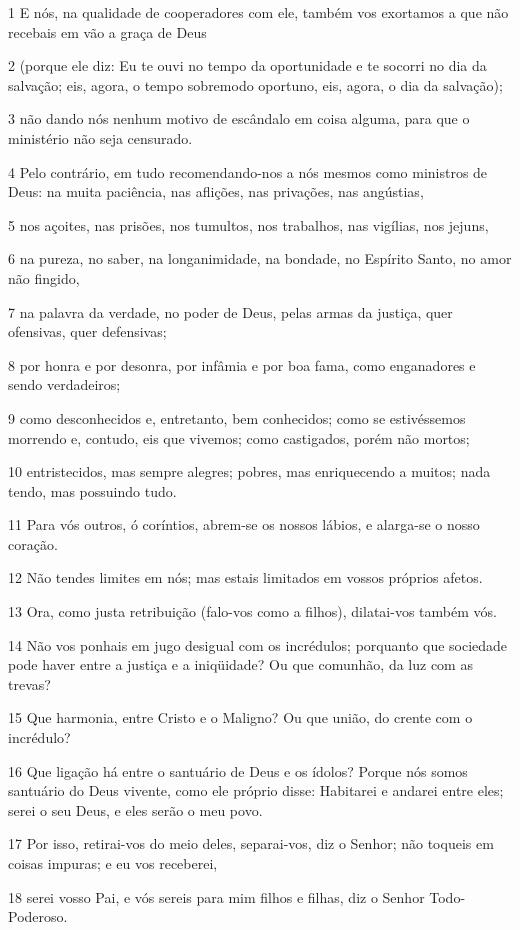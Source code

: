 \par 1 E nós, na qualidade de cooperadores com ele, também vos exortamos a que não recebais em vão a graça de Deus
\par 2 (porque ele diz: Eu te ouvi no tempo da oportunidade e te socorri no dia da salvação; eis, agora, o tempo sobremodo oportuno, eis, agora, o dia da salvação);
\par 3 não dando nós nenhum motivo de escândalo em coisa alguma, para que o ministério não seja censurado.
\par 4 Pelo contrário, em tudo recomendando-nos a nós mesmos como ministros de Deus: na muita paciência, nas aflições, nas privações, nas angústias,
\par 5 nos açoites, nas prisões, nos tumultos, nos trabalhos, nas vigílias, nos jejuns,
\par 6 na pureza, no saber, na longanimidade, na bondade, no Espírito Santo, no amor não fingido,
\par 7 na palavra da verdade, no poder de Deus, pelas armas da justiça, quer ofensivas, quer defensivas;
\par 8 por honra e por desonra, por infâmia e por boa fama, como enganadores e sendo verdadeiros;
\par 9 como desconhecidos e, entretanto, bem conhecidos; como se estivéssemos morrendo e, contudo, eis que vivemos; como castigados, porém não mortos;
\par 10 entristecidos, mas sempre alegres; pobres, mas enriquecendo a muitos; nada tendo, mas possuindo tudo.
\par 11 Para vós outros, ó coríntios, abrem-se os nossos lábios, e alarga-se o nosso coração.
\par 12 Não tendes limites em nós; mas estais limitados em vossos próprios afetos.
\par 13 Ora, como justa retribuição (falo-vos como a filhos), dilatai-vos também vós.
\par 14 Não vos ponhais em jugo desigual com os incrédulos; porquanto que sociedade pode haver entre a justiça e a iniqüidade? Ou que comunhão, da luz com as trevas?
\par 15 Que harmonia, entre Cristo e o Maligno? Ou que união, do crente com o incrédulo?
\par 16 Que ligação há entre o santuário de Deus e os ídolos? Porque nós somos santuário do Deus vivente, como ele próprio disse: Habitarei e andarei entre eles; serei o seu Deus, e eles serão o meu povo.
\par 17 Por isso, retirai-vos do meio deles, separai-vos, diz o Senhor; não toqueis em coisas impuras; e eu vos receberei,
\par 18 serei vosso Pai, e vós sereis para mim filhos e filhas, diz o Senhor Todo-Poderoso.

